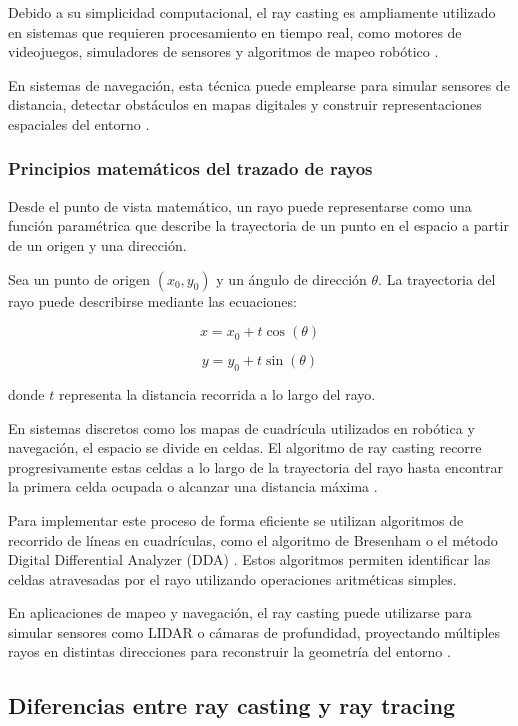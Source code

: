 Debido a su simplicidad computacional, el ray casting es ampliamente utilizado en sistemas que requieren procesamiento en tiempo real, como motores de videojuegos, simuladores de sensores y algoritmos de mapeo robótico \cite{wikipedia_wolfenstein}.

En sistemas de navegación, esta técnica puede emplearse para simular sensores de distancia, detectar obstáculos en mapas digitales y construir representaciones espaciales del entorno \cite{elfes1989}.

\subsubsection{Principios matemáticos del trazado de rayos}

Desde el punto de vista matemático, un rayo puede representarse como una función paramétrica que describe la trayectoria de un punto en el espacio a partir de un origen y una dirección.

Sea un punto de origen $(x_0, y_0)$ y un ángulo de dirección $\theta$. La trayectoria del rayo puede describirse mediante las ecuaciones:

\[
x = x_0 + t\cos(\theta)
\]

\[
y = y_0 + t\sin(\theta)
\]

donde $t$ representa la distancia recorrida a lo largo del rayo.

En sistemas discretos como los mapas de cuadrícula utilizados en robótica y navegación, el espacio se divide en celdas. El algoritmo de ray casting recorre progresivamente estas celdas a lo largo de la trayectoria del rayo hasta encontrar la primera celda ocupada o alcanzar una distancia máxima \cite{elfes1989}.

Para implementar este proceso de forma eficiente se utilizan algoritmos de recorrido de líneas en cuadrículas, como el algoritmo de Bresenham \cite{bresenham1965} o el método Digital Differential Analyzer (DDA) \cite{wikipedia_dda}. Estos algoritmos permiten identificar las celdas atravesadas por el rayo utilizando operaciones aritméticas simples.

En aplicaciones de mapeo y navegación, el ray casting puede utilizarse para simular sensores como LIDAR o cámaras de profundidad, proyectando múltiples rayos en distintas direcciones para reconstruir la geometría del entorno \cite{elfes1989}.

\subsection{Diferencias entre ray casting y ray tracing}

